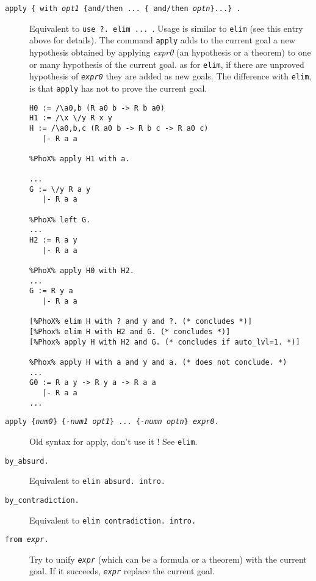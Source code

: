 \begin{description}

\item[{\tt apply  \{ with {\em opt1} \{and/then  ... 
\{ 
and/then
{\em optn}\}...\} 
.}]


  
Equivalent to {\tt use ?. elim ... }. Usage is similar to {\tt elim}
(see this entry above for details).  The command {\tt apply} adds to the
current goal a new hypothesis obtained by applying {\em expr0} (an
hypothesis or a theorem) to one or many hypothesis of the current goal.
as for {\tt elim}, if there are unproved hypothesis of {\tt\em expr0}
they are added as new goals. The difference with {\tt elim}, is that
{\tt apply} has not to prove the current goal.

\begin{verbatim}
H0 := /\a0,b (R a0 b -> R b a0)
H1 := /\x \/y R x y
H := /\a0,b,c (R a0 b -> R b c -> R a0 c)
   |- R a a

%PhoX% apply H1 with a.  

...
G := \/y R a y
   |- R a a

%PhoX% left G.  
...
H2 := R a y
   |- R a a

%PhoX% apply H0 with H2.  
...
G := R y a
   |- R a a

[%PhoX% elim H with ? and y and ?. (* concludes *)]
[%Phox% elim H with H2 and G. (* concludes *)]
[%Phox% apply H with H2 and G. (* concludes if auto_lvl=1. *)]

%Phox% apply H with a and y and a. (* does not conclude. *)
...
G0 := R a y -> R y a -> R a a
   |- R a a
...
\end{verbatim}

\item[{\tt apply  \{{\em num0}\} \{-{\em num1} {\em opt1}\} ... \{-{\em numn}
  {\em optn}\} {\em expr0}.}]
Old syntax for apply, don't use it ! See {\tt elim}. 

\item[{\tt by\_absurd.}]

  Equivalent to {\tt elim absurd. intro.}

\item[{\tt by\_contradiction.}]

  Equivalent to {\tt elim contradiction. intro.}

\item[{\tt from {\em expr}.}]

  Try to unify {\tt\em expr} (which can be a formula or a
  theorem) with the current goal. If it succeeds, {\tt\em expr} replace the
  current goal.


\end{description}
